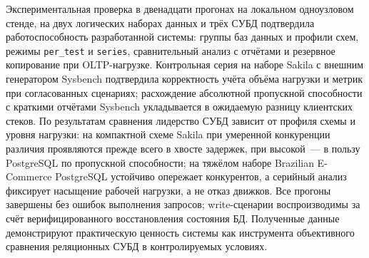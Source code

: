 Экспериментальная проверка в двенадцати прогонах на локальном одноузловом стенде, на двух логических наборах данных и трёх СУБД подтвердила работоспособность разработанной системы: группы баз данных и профили схем, режимы \texttt{per\_test} и \texttt{series}, сравнительный анализ с отчётами и резервное копирование при OLTP-нагрузке. Контрольная серия на наборе Sakila с внешним генератором Sysbench подтвердила корректность учёта объёма нагрузки и метрик при согласованных сценариях; расхождение абсолютной пропускной способности с краткими отчётами Sysbench укладывается в ожидаемую разницу клиентских стеков. По результатам сравнения лидерство СУБД зависит от профиля схемы и уровня нагрузки: на компактной схеме Sakila при умеренной конкуренции различия проявляются прежде всего в хвосте задержек, при высокой~--- в пользу PostgreSQL по пропускной способности; на тяжёлом наборе Brazilian E-Commerce PostgreSQL устойчиво опережает конкурентов, а серийный анализ фиксирует насыщение рабочей нагрузки, а не отказ движков. Все прогоны завершены без ошибок выполнения запросов; write-сценарии воспроизводимы за счёт верифицированного восстановления состояния БД. Полученные данные демонстрируют практическую ценность системы как инструмента объективного сравнения реляционных СУБД в контролируемых условиях.

